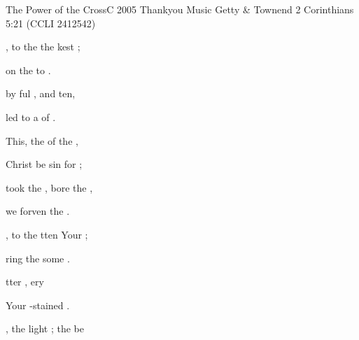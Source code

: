 \documentclass[12pt]{book}
\newcommand{\CCLInumber}{2412542}
\newcommand{\CCLIed}{{\CpyRtInfoFont (CCLI \CCLInumber)}}
\begin{document}
\begin{song}{The Power of the Cross}{C}
    {2005 Thankyou Music}
    {Getty \& Townend}
    {2 Corinthians 5:21}
    {\CCLIed}

    \Ch{Intro: [Am}{}  \Ch{C]x2}{}
    \begin{SBVerse}
        
        , to  the  
             the kest ; 

         on the  to 
            .

         by ful , 
             and ten, 

        led to a  of .

    \end{SBVerse}

    \begin{SBChorus}

        This, the  of the ,

        Christ be sin for ;

        took the , bore the ,

        we  forven  the . 
            \Ch{[Am}{}  \Ch{C]}{}

    \end{SBChorus}

    \begin{SBVerse}
        
        , to  the  
            tten  Your ; 

        ring the some
              .

         tter , 
            ery  

         Your -stained .

    \end{SBVerse}

    \begin{SBVerse}
        
        , the light ; 
             the  be


\end{SBVerse}
\end{song}
\end{document}
